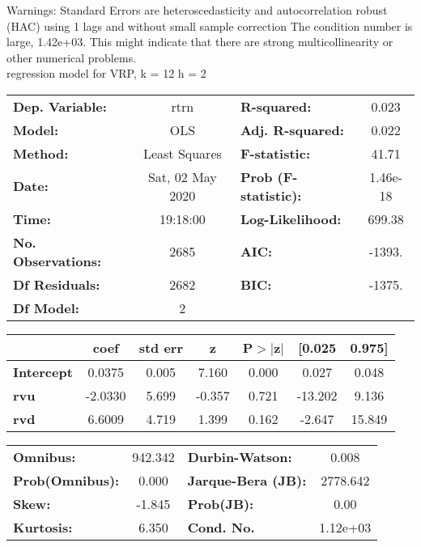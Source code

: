 Warnings: \newline
 [1] Standard Errors are heteroscedasticity and autocorrelation robust (HAC) using 1 lags and without small sample correction \newline
 [2] The condition number is large, 1.42e+03. This might indicate that there are \newline
 strong multicollinearity or other numerical problems.\\ 

regression model for VRP, k = 12 h = 2\begin{center}
\begin{tabular}{lclc}
\toprule
\textbf{Dep. Variable:}    &       rtrn       & \textbf{  R-squared:         } &     0.023   \\
\textbf{Model:}            &       OLS        & \textbf{  Adj. R-squared:    } &     0.022   \\
\textbf{Method:}           &  Least Squares   & \textbf{  F-statistic:       } &     41.71   \\
\textbf{Date:}             & Sat, 02 May 2020 & \textbf{  Prob (F-statistic):} &  1.46e-18   \\
\textbf{Time:}             &     19:18:00     & \textbf{  Log-Likelihood:    } &    699.38   \\
\textbf{No. Observations:} &        2685      & \textbf{  AIC:               } &    -1393.   \\
\textbf{Df Residuals:}     &        2682      & \textbf{  BIC:               } &    -1375.   \\
\textbf{Df Model:}         &           2      & \textbf{                     } &             \\
\bottomrule
\end{tabular}
\begin{tabular}{lcccccc}
                   & \textbf{coef} & \textbf{std err} & \textbf{z} & \textbf{P$> |$z$|$} & \textbf{[0.025} & \textbf{0.975]}  \\
\midrule
\textbf{Intercept} &       0.0375  &        0.005     &     7.160  &         0.000        &        0.027    &        0.048     \\
\textbf{rvu}       &      -2.0330  &        5.699     &    -0.357  &         0.721        &      -13.202    &        9.136     \\
\textbf{rvd}       &       6.6009  &        4.719     &     1.399  &         0.162        &       -2.647    &       15.849     \\
\bottomrule
\end{tabular}
\begin{tabular}{lclc}
\textbf{Omnibus:}       & 942.342 & \textbf{  Durbin-Watson:     } &    0.008  \\
\textbf{Prob(Omnibus):} &   0.000 & \textbf{  Jarque-Bera (JB):  } & 2778.642  \\
\textbf{Skew:}          &  -1.845 & \textbf{  Prob(JB):          } &     0.00  \\
\textbf{Kurtosis:}      &   6.350 & \textbf{  Cond. No.          } & 1.12e+03  \\
\bottomrule
\end{tabular}
\end{center}

